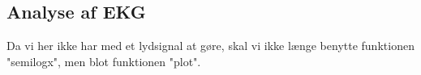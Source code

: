 \documentclass[12pt, letterpaper]{article}
\begin{document}
\begin{figure}[!h]
           \begin{floatrow}
       
           \end{floatrow}
\end{figure}


\newpage




\subsection{Analyse af EKG}
Da vi her ikke har med et lydsignal at gøre, skal vi ikke længe benytte funktionen "semilogx", men blot funktionen "plot".

\newpage
\end{document}
